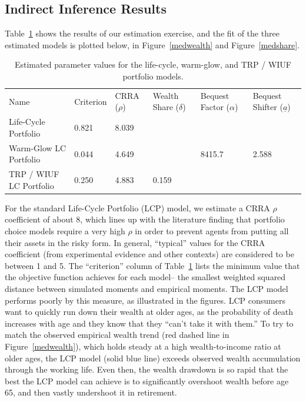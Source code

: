 \documentclass{article}
\newcommand{\CRRA}{\rho}
\begin{document}
\subsection{Indirect Inference Results}

Table~\ref{parameters} shows the results of our estimation exercise, and the fit of the three estimated models is plotted below, in Figure~\ref{medwealth} and Figure~\ref{medshare}.

\begin{table}
\centering
\caption[]{Estimated parameter values for the life-cycle, warm-glow, and TRP / WIUF portfolio models.}
\label{parameters}
\begin{tabular}{p{}p{}p{}p{}p{}p{}}
\toprule
Name & Criterion & CRRA ($\CRRA$) & Wealth Share ($\delta$) & Bequest Factor ($\alpha$) & Bequest Shifter ($\underline{a}$) \\
Life-Cycle Portfolio & 0.821 & 8.039 &  &  &  \\
Warm-Glow LC Portfolio & 0.044 & 4.649 &  & 8415.7 & 2.588 \\
TRP / WIUF LC Portfolio & 0.250 & 4.883 & 0.159 &  &  \\
\bottomrule
\end{tabular}
\end{table}

For the standard Life-Cycle Portfolio (LCP) model, we estimate a CRRA $\CRRA$ coefficient of about 8, which lines up with the literature finding that portfolio choice models require a very high $\CRRA$ in order to prevent agents from putting all their assets in the risky form.
In general, ``typical'' values for the CRRA coefficient (from experimental evidence and other contexts) are considered to be between 1 and 5.
The ``criterion'' column of Table~\ref{parameters} lists the minimum value that the objective function achieves for each model-- the smallest weighted squared distance between simulated moments and empirical moments.
The LCP model performs poorly by this measure, as illustrated in the figures.
LCP consumers want to quickly run down their wealth at older ages, as the probability of death increases with age and they know that they ``can't take it with them.''
To try to match the observed empirical wealth trend (red dashed line in Figure~\ref{medwealth}), which holds steady at a high wealth-to-income ratio at older ages, the LCP model (solid blue line) exceeds observed wealth accumulation through the working life.
Even then, the wealth drawdown is so rapid that the best the LCP model can achieve is to significantly overshoot wealth before age 65, and then vastly undershoot it in retirement.
\end{document}
